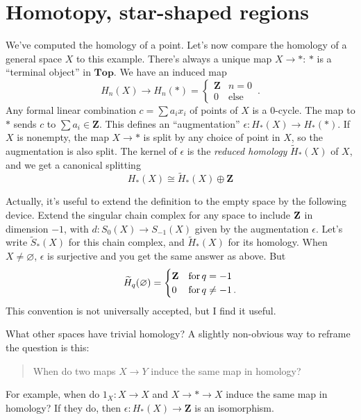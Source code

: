\section{Homotopy, star-shaped regions}

We've computed the homology of a point. Let's now compare the homology of
a general space $X$ to this example. There's always a unique map $X\to\ast$: $\ast$ is a ``terminal object'' in $\mathbf{Top}$. We have an induced map 
\[ 
H_n(X)\to H_n(\ast)=
\begin{cases}\mathbf{Z} & n=0\\
0 & \text{else}\end{cases}\,.
\]
Any formal linear combination $c=\sum a_i x_i$ of points of $X$ is a 0-cycle. 
The map to $\ast$ sends $c$ to $\sum a_i\in\mathbf{Z}$. This defines
an ``augmentation'' $\epsilon:H_*(X)\to H_*(\ast)$. 
If $X$ is nonempty, the map $X\to\ast$ is split by any choice of point in $X$,
so the augmentation is also split. The kernel of $\epsilon$ is the 
{\em reduced homology} $\widetilde H_*(X)$ of $X$, and we get a canonical 
splitting 
\[
H_*(X)\cong \widetilde H_*(X)\oplus\mathbf{Z}
\]

Actually, it's useful to extend the definition to the empty space by the
following device. Extend the singular chain complex for any space to include 
$\mathbf Z$ in dimension $-1$, with $d:S_0(X)\to S_{-1}(X)$ given by the 
augmentation $\epsilon$. Let's write $\widetilde S_*(X)$ for this chain 
complex, and $\widetilde H_*(X)$ for its homology. 
When $X\neq\varnothing$, $\epsilon$ is surjective
and you get the same answer as above. But 
\[
\widetilde H_q(\varnothing)=
\begin{cases}\mathbf{Z} & \hbox{for}\,q=-1\\0 & \hbox{for}\,q\neq-1\,.
\end{cases}
\]
This convention is not universally accepted, but I find it useful.

What other spaces have trivial homology? A slightly non-obvious way to reframe
the question is this:
\begin{quote}
When do two maps $X\to Y$ induce the same map in homology? 
\end{quote}
For example,
when do $1_X:X\to X$ and $X\to\ast\to X$ induce the same map in homology?
If they do, then $\epsilon:H_*(X)\to\mathbf{Z}$ is an isomorphism. 

